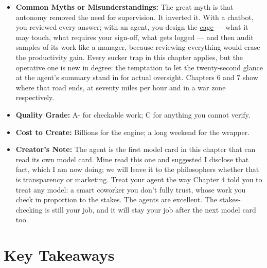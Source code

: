 \begin{itemize}
    \item \textbf{Common Myths or Misunderstandings:} The great myth is that autonomy removed the need for supervision. It inverted it. With a chatbot, you reviewed every answer; with an agent, you design the \hyperref[sec:creative]{cage} --- what it may touch, what requires your sign-off, what gets logged --- and then audit samples of its work like a manager, because reviewing everything would erase the productivity gain. Every sucker trap in this chapter applies, but the operative one is new in degree: the temptation to let the twenty-second glance at the agent's summary stand in for actual oversight. Chapters 6 and 7 show where that road ends, at seventy miles per hour and in a war zone respectively.
    \item \textbf{Quality Grade:} A- for checkable work; C for anything you cannot verify.
    \item \textbf{Cost to Create:} Billions for the engine; a long weekend for the wrapper.
    \item \textbf{Creator's Note:} The agent is the first model card in this chapter that can read its own model card. Mine read this one and suggested I disclose that fact, which I am now doing; we will leave it to the philosophers whether that is transparency or marketing. Treat your agent the way Chapter 4 told you to treat any model: a smart coworker you don't fully trust, whose work you check in proportion to the stakes. The agents are excellent. The stakes-checking is still your job, and it will stay your job after the next model card too.
\end{itemize}

\section{Key Takeaways}

